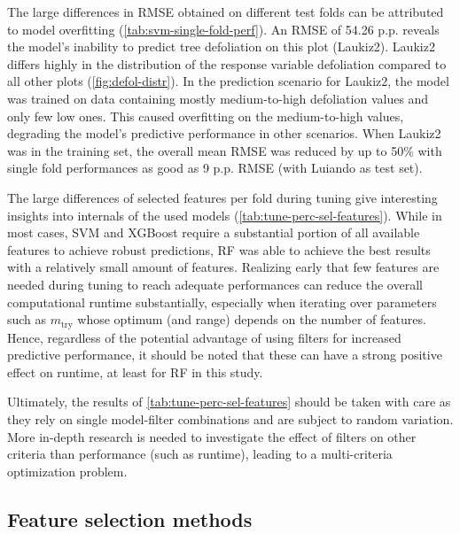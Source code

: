 \documentclass[letterpaper, peerreview, draftcls]{IEEEtran}
\begin{document}
The large differences in RMSE obtained on different test folds can be attributed to model overfitting (\autoref{tab:svm-single-fold-perf}).
An RMSE of 54.26 p.p. reveals the model's inability to predict tree defoliation on this plot (Laukiz2).
Laukiz2 differs highly in the distribution of the response variable defoliation compared to all other plots (\autoref{fig:defol-distr}).
In the prediction scenario for Laukiz2, the model was trained on data containing mostly medium-to-high defoliation values and only few low ones.
This caused overfitting on the medium-to-high values, degrading the model's predictive performance in other scenarios.
When Laukiz2 was in the training set, the overall mean RMSE was reduced by up to 50\% with single fold performances as good as 9 p.p. RMSE (with Luiando as test set).

The large differences of selected features per fold during tuning give interesting insights into internals of the used models (\autoref{tab:tune-perc-sel-features}).
While in most cases, SVM and XGBoost require a substantial portion of all available features to achieve robust predictions, RF was able to achieve the best results with a relatively small amount of features.
Realizing early that few features are needed during tuning to reach adequate performances can reduce the overall computational runtime substantially, especially when iterating over parameters such as $m_\textrm{try}$ whose optimum (and range) depends on the number of features.
Hence, regardless of the potential advantage of using filters for increased predictive performance, it should be noted that these can have a strong positive effect on runtime, at least for RF in this study.

Ultimately, the results of \autoref{tab:tune-perc-sel-features} should be taken with care as they rely on single model-filter combinations and are subject to random variation.
More in-depth research is needed to investigate the effect of filters on other criteria than performance (such as runtime), leading to a multi-criteria optimization problem.

\subsection{Feature selection methods}
\end{document}
